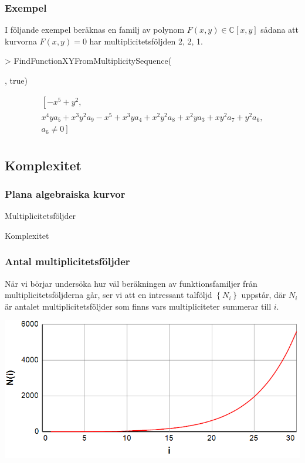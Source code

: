 \documentclass{beamer}
\begin{document}
\begin{frame}
	\frametitle{Exempel}
	\begin{example}
		I följande exempel beräknas en familj av polynom $F(x, y) \in \mathbb{C}[x, y]$ sådana att kurvorna $F(x, y) = 0$ har multiplicitetsföljden 2, 2, 1.
		
		\begin{semiverbatim}
			> FindFunctionXYFromMultiplicitySequence(

\qquad [2,2,1], true)
		\end{semiverbatim}
\[
\begin{array}{l}
\left[-x^5+y^2,\right.\\
x^4ya_5+x^3y^2a_9-x^5+x^3ya_4+x^2y^2a_8+x^2ya_3+xy^2a_7+y^2a_6,\\
\left.a_6 \neq 0\right]\\
\end{array}
\]
	\end{example}
\end{frame}



\subsection{Komplexitet}

\begin{frame}
	\frametitle{Plana algebraiska kurvor}
	\begin{center}
		\Large Multiplicitetsföljder
		
		Komplexitet
	\end{center}
\end{frame}

\begin{frame}
	\frametitle{Antal multiplicitetsföljder}
När vi börjar undersöka hur väl beräkningen av funktionsfamiljer från multiplicitetsföljderna går, ser vi att en intressant talföljd $\left\{N_i\right\}$ uppstår, där $N_i$ är antalet multiplicitetsföljder som finns vars multipliciteter summerar till $i$.

\begin{center}
	\includegraphics[scale=0.5]{Export/Complexity1.png}
\end{center}
\end{frame}
\end{document}
